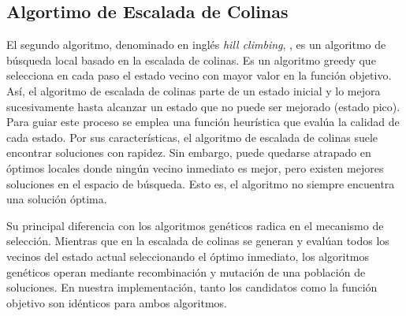 \subsection{Algortimo de Escalada de Colinas}
\label{alg:approachHC}

El segundo algoritmo, denominado en inglés \textit{hill climbing},
\cite{Russell:2009, Cormen2009, kleinberg2006}, es un algoritmo de búsqueda local basado en la escalada de colinas.
Es un algoritmo greedy que selecciona en cada paso el estado vecino con mayor
valor en la función objetivo. 
Así, el algoritmo de escalada de colinas parte de un estado inicial y lo mejora sucesivamente hasta alcanzar un estado que no puede ser mejorado (estado pico). 
Para guiar este proceso se emplea una función heurística que evalúa la calidad de cada estado.
Por sus características, el algoritmo de escalada de colinas suele encontrar soluciones
con rapidez. Sin embargo, puede quedarse atrapado en óptimos locales donde
ningún vecino inmediato es mejor, pero existen mejores soluciones en el espacio
de búsqueda. Esto es, el algoritmo no siempre encuentra una solución óptima.

Su principal diferencia con los algoritmos genéticos radica en el mecanismo de selección. Mientras que en la escalada de colinas se generan y evalúan todos los vecinos del estado actual seleccionando el óptimo inmediato, 
los algoritmos genéticos operan mediante recombinación y mutación de una población de soluciones. 
En nuestra implementación, tanto los candidatos como la función objetivo son idénticos para ambos algoritmos.





